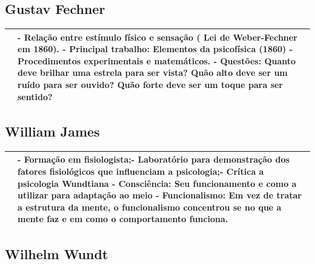 \documentclass[
]{book}
\begin{document}
\hypertarget{gustav-fechner}{%
\subsection{Gustav Fechner}\label{gustav-fechner}}

\begin{longtable}[]{@{}
  >{\centering\arraybackslash}p{}
  >{\raggedright\arraybackslash}p{}@{}}
\toprule()
\endhead
& - Relação entre estímulo físico e sensação ( Lei de Weber-Fechner em 1860). - Principal trabalho: Elementos da psicofísica (1860) - Procedimentos experimentais e matemáticos. - Questões: Quanto deve brilhar uma estrela para ser vista? Quão alto deve ser um ruído para ser ouvido? Quão forte deve ser um toque para ser sentido? \\
\bottomrule()
\end{longtable}

\hypertarget{william-james}{%
\subsection{William James}\label{william-james}}

\begin{longtable}[]{@{}
  >{\centering\arraybackslash}p{}
  >{\raggedright\arraybackslash}p{}@{}}
\toprule()
\endhead
& - Formação em fisiologista;- Laboratório para demonstração dos fatores fisiológicos que influenciam a psicologia;- Crítica a psicologia Wundtiana - Consciência: Seu funcionamento e como a utilizar para adaptação ao meio - Funcionalismo: Em vez de tratar a \textbf{estrutura da mente}, o \textbf{funcionalismo concentrou} se \textbf{no que a mente faz} e em \textbf{como o comportamento funciona}. \\
\bottomrule()
\end{longtable}

\hypertarget{wilhelm-wundt}{%
\subsection{Wilhelm Wundt}\label{wilhelm-wundt}}
\end{document}
